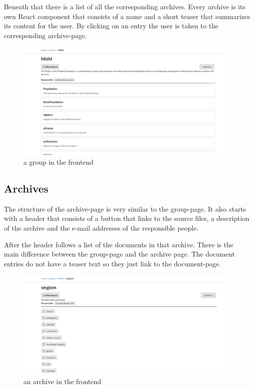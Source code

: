 \documentclass[11pt,a4paper]{article}
\begin{document}
Beneath that there is a list of all the corresponding archives.
Every archive is its own React component that consists of a name and a short teaser that summarizes its content for the user.
By clicking on an entry the user is taken to the corresponding archive-page.
\begin{figure}[H]
\includegraphics[width=1\textwidth]{group.png}
\caption{a group in the frontend}
\end{figure}

\subsection{Archives}
The structure of the archive-page is very similar to the group-page.
It also starts with a header that consists of a button that links to the source files, a description of the archive and the e-mail addresses of the responsible people. 

After the header follows a list of the documents in that archive.
There is the main difference between the group-page and the archive page.
The document entries do not have a teaser text so they just link to the document-page.
\begin{figure}[H]
\includegraphics[width=1\textwidth]{archive.png}
\caption{ an archive in the frontend}
\end{figure}
\end{document}
